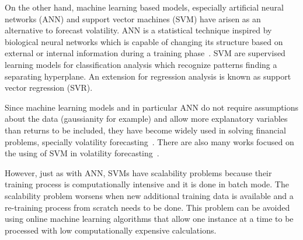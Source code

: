 On the other hand, machine learning based models, especially artificial neural
networks (ANN) and support vector machines (SVM) have arisen as an alternative
to forecast volatility. ANN is a statistical technique inspired by biological
neural networks which is capable of changing its structure based on external or
internal information during a training phase~\cite{sammut2011}. SVM are
supervised learning models for classification analysis which recognize patterns
finding a separating hyperplane. An extension for regression analysis is known
as support vector regression (SVR). 

Since machine learning models and in particular ANN do not require assumptions
about the data (gaussianity for example) and allow more explanatory variables
than returns to be included, they have become widely used in solving financial
problems, specially volatility
forecasting~\cite{hamidetal2004,donaldsonetal1997}. There are also many works
focused on the using of SVM in volatility
forecasting~\cite{shiyietal2008,shiyietal2010,gavrishchaka2006,vasilios2012}. 

However, just as with ANN, SVMs have scalability problems because their
training process is computationally intensive and it is done in batch mode. The
scalability problem worsens when new additional training data is available and
a re-training process from scratch needs to be done. This problem can be
avoided using online machine learning algorithms that allow one instance at a
time to be processed with low computationally expensive calculations.




%
